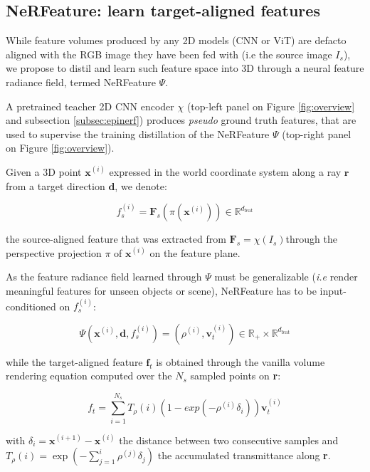 \subsection{NeRFeature: learn target-aligned features}
\label{subsec:nerfeature}

While feature volumes produced by any 2D models (CNN or ViT) are defacto aligned with the RGB image they have been fed with (i.e the source image $I_s$), we propose to distil and learn such feature space into 3D through a neural feature radiance field, termed NeRFeature $\Psi$. 

A pretrained teacher 2D CNN encoder $\chi$ (top-left panel on Figure \ref{fig:overview} and subsection \ref{subsec:epinerf}) produces \textit{pseudo} ground truth features, that are used to supervise the training distillation of the NeRFeature $\Psi$ (top-right panel on Figure \ref{fig:overview}).

Given a 3D point $\mathbf{x}^{(i)}$ expressed in the world coordinate system along a ray $\mathbf{r}$ from a target direction $\mathbf{d}$, we denote: 

\begin{equation}
    f_{s}^{(i)} = \mathbf{F}_{s}(\pi(\mathbf{x}^{(i)}))  \in \mathbb{R}^{d_{\text{feat}}} 
    \label{eq:projection}
\end{equation}

the source-aligned feature that was extracted from $\mathbf{F}_{s}=\chi(I_{s})$through the perspective projection $\pi$ of $\mathbf{x}^{(i)}$ on the feature plane.

As the feature radiance field learned through $\Psi$ must be generalizable (\textit{i.e} render meaningful features for unseen objects or scene), NeRFeature has to be input-conditioned on $f_{s}^{(i)}$: 

\begin{equation}
    \Psi(\mathbf{x}^{(i)},\mathbf{d},f_{s}^{(i)}) = (\rho^{(i)},\mathbf{v}_{t}^{(i)}) \in \mathbb{R}_{+}\times \mathbb{R}^{d_{\text{feat}}}
\end{equation}

while the target-aligned feature $\mathbf{f}_{t}$ is obtained through the vanilla volume rendering equation computed over the $N_s$ sampled points on \textbf{r}: 

\begin{equation}
    f_{t} = \sum_{i=1}^{N_{s}} T_{\rho}(i)(1-exp(-\rho^{(i)}\delta_{i}))\mathbf{v}_{t}^{(i)}
\end{equation}

with $\delta_{i}=\mathbf{x}^{(i+1)}-\mathbf{x}^{(i)}$  the distance between two consecutive samples and $T_{\rho}(i) = \exp\left(-\sum_{j=1}^{i}\rho^{(j)}\delta_{j}\right)$ the accumulated transmittance along \textbf{r}.

